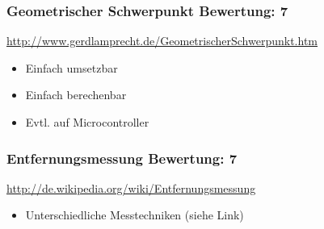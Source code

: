 \subsubsection{Geometrischer Schwerpunkt  \hfill Bewertung: 7}
\url{http://www.gerdlamprecht.de/GeometrischerSchwerpunkt.htm}
\begin{itemize}
    \item Einfach umsetzbar
    \item Einfach berechenbar
    \item Evtl. auf Microcontroller
\end{itemize}

\subsubsection{Entfernungsmessung  \hfill Bewertung: 7}
\url{http://de.wikipedia.org/wiki/Entfernungsmessung}
\begin{itemize}
    \item Unterschiedliche Messtechniken (siehe Link)
\end{itemize}
